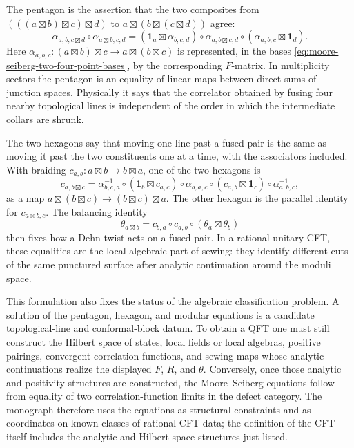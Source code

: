 The pentagon is the assertion that the two composites from
\((((a\boxtimes b)\boxtimes c)\boxtimes d)\) to
\(a\boxtimes(b\boxtimes(c\boxtimes d))\) agree:
\begin{equation}
  \alpha_{a,b,c\boxtimes d}\circ\alpha_{a\boxtimes b,c,d}
  =
  (\mathbf 1_a\boxtimes\alpha_{b,c,d})\circ
  \alpha_{a,b\boxtimes c,d}\circ
  (\alpha_{a,b,c}\boxtimes\mathbf 1_d).
  \label{eq:moore-seiberg-pentagon-associator}
\end{equation}
Here \(\alpha_{a,b,c}:(a\boxtimes b)\boxtimes c\to
a\boxtimes(b\boxtimes c)\) is represented, in the bases
\eqref{eq:moore-seiberg-two-four-point-bases}, by the corresponding
\(F\)-matrix.  In multiplicity sectors the pentagon is an equality of linear
maps between direct sums of junction spaces.  Physically it says that the
correlator obtained by fusing four nearby topological lines is independent of
the order in which the intermediate collars are shrunk.

The two hexagons say that moving one line past a fused pair is the same as
moving it past the two constituents one at a time, with the associators
included.  With braiding
\(c_{a,b}:a\boxtimes b\to b\boxtimes a\), one of the two hexagons is
\begin{equation}
  c_{a,b\boxtimes c}
  =
  \alpha_{b,c,a}^{-1}\circ
  (\mathbf 1_b\boxtimes c_{a,c})\circ
  \alpha_{b,a,c}\circ
  (c_{a,b}\boxtimes \mathbf 1_c)\circ
  \alpha_{a,b,c}^{-1},
  \label{eq:moore-seiberg-hexagon-one}
\end{equation}
as a map \(a\boxtimes(b\boxtimes c)\to (b\boxtimes c)\boxtimes a\).
The other hexagon is the parallel identity for
\(c_{a\boxtimes b,c}\).  The balancing identity
\[
  \theta_{a\boxtimes b}
  =
  c_{b,a}\circ c_{a,b}\circ(\theta_a\boxtimes\theta_b)
\]
then fixes how a Dehn twist acts on a fused pair.  In a rational unitary CFT,
these equalities are the local algebraic part of sewing: they identify
different cuts of the same punctured surface after analytic continuation
around the moduli space.

This formulation also fixes the status of the algebraic classification
problem.  A solution of the pentagon, hexagon, and modular equations is a
candidate topological-line and conformal-block datum.  To obtain a QFT one
must still construct the Hilbert space of states, local fields or local
algebras, positive pairings, convergent correlation functions, and sewing maps
whose analytic continuations realize the displayed \(F\), \(R\), and
\(\theta\).  Conversely, once those analytic and positivity structures are
constructed, the Moore--Seiberg equations follow from equality of two
correlation-function limits in the defect category.  The monograph therefore
uses the equations as structural constraints and as coordinates on known
classes of rational CFT data; the definition of the CFT itself includes the
analytic and Hilbert-space structures just listed.

